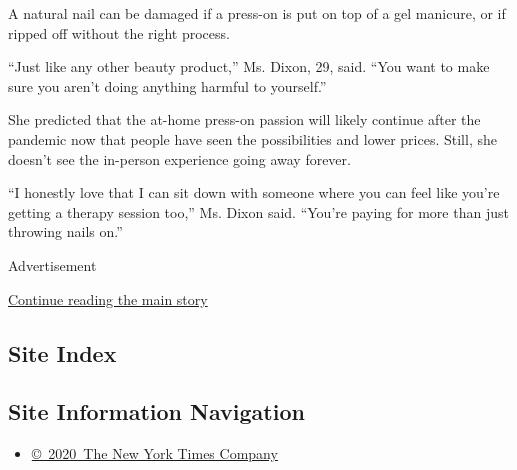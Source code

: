 A natural nail can be damaged if a press-on is put on top of a gel
manicure, or if ripped off without the right process.

``Just like any other beauty product,'' Ms. Dixon, 29, said. ``You want
to make sure you aren't doing anything harmful to yourself.''

She predicted that the at-home press-on passion will likely continue
after the pandemic now that people have seen the possibilities and lower
prices. Still, she doesn't see the in-person experience going away
forever.

``I honestly love that I can sit down with someone where you can feel
like you're getting a therapy session too,'' Ms. Dixon said. ``You're
paying for more than just throwing nails on.''

Advertisement

\protect\hyperlink{after-bottom}{Continue reading the main story}

\hypertarget{site-index}{%
\subsection{Site Index}\label{site-index}}

\hypertarget{site-information-navigation}{%
\subsection{Site Information
Navigation}\label{site-information-navigation}}

\begin{itemize}
\tightlist
\item
  \href{https://help.nytimes3xbfgragh.onion/hc/en-us/articles/115014792127-Copyright-notice}{©~2020~The
  New York Times Company}
\end{itemize}

